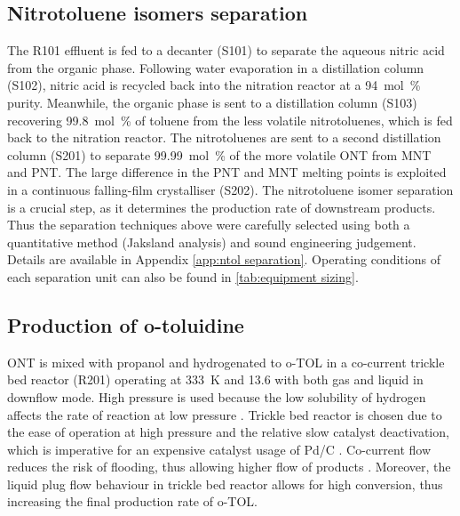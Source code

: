 
\subsection{Nitrotoluene isomers separation}
The R101 effluent is fed to a decanter (S101) to separate the aqueous nitric acid from the organic phase. Following water evaporation in a distillation column (S102), nitric acid is recycled back into the nitration reactor at a \SI{94}{mol\percent} purity.
Meanwhile, the organic phase is sent to a distillation column (S103) recovering \SI{99.8}{mol\percent} of toluene from the less volatile nitrotoluenes, which is fed back to the nitration reactor. The nitrotoluenes are sent to a second distillation column (S201) to separate \SI{99.99}{mol\percent} of the more volatile ONT from MNT and PNT. The large difference in the PNT and MNT melting points is exploited in a continuous falling-film crystalliser (S202). 
The nitrotoluene isomer separation is a crucial step, as it determines the production rate of downstream products. Thus the separation techniques above were carefully selected using both a quantitative method (Jaksland analysis) \cite{jaksland_separation_1995} and sound engineering judgement. Details are available in Appendix \ref{app:ntol separation}. Operating conditions of each separation unit can also be found in \cref{tab:equipment sizing}. 

\subsection{Production of o-toluidine}
ONT is mixed with propanol and hydrogenated to o-TOL in a co-current trickle bed reactor (R201) operating at \SI{333}{\K} and \SI{13.6}{\atm} with both gas and liquid in downflow mode. High pressure is used because the low solubility of hydrogen affects the rate of reaction at low pressure \cite{rajadhyaksha_solvent_1986}. Trickle bed reactor is chosen due to the ease of operation at high pressure and the relative slow catalyst deactivation, which is imperative for an expensive catalyst usage of Pd/C \cite{vemala_hydrodynamic_nodate}. Co-current flow reduces the risk of flooding, thus allowing higher flow of products \cite{vemala_hydrodynamic_nodate}. Moreover, the liquid plug flow behaviour in trickle bed reactor allows for high conversion, thus increasing the final production rate of o-TOL. 

